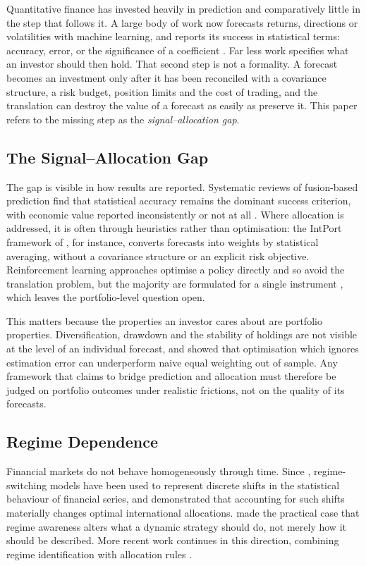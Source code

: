 \documentclass{singlecol-new}
\theoremstyle{TH}{
\newtheorem{lemma}{Lemma}
\newtheorem{theorem}[lemma]{Theorem}
\newtheorem{corrolary}[lemma]{Corrolary}
\newtheorem{conjecture}[lemma]{Conjecture}
\newtheorem{proposition}[lemma]{Proposition}
\newtheorem{claim}[lemma]{Claim}
\newtheorem{stheorem}[lemma]{Wrong Theorem}
\newtheorem{algorithm}{Algorithm}
}
\theoremstyle{THrm}{
\newtheorem{definition}{Definition}[section]
\newtheorem{question}{Question}[section]
\newtheorem{remark}{Remark}
\newtheorem{scheme}{Scheme}
}
\theoremstyle{THhit}{
\newtheorem{case}{Case}[section]
}
\begin{document}
Quantitative finance has invested heavily in prediction and comparatively little in the
step that follows it. A large body of work now forecasts returns, directions or
volatilities with machine learning, and reports its success in statistical terms:
accuracy, error, or the significance of a coefficient \citep{gu20, zhang22}. Far less
work specifies what an investor should then hold. That second step is not a
formality. A forecast becomes an investment only after it has been reconciled with a
covariance structure, a risk budget, position limits and the cost of trading, and the
translation can destroy the value of a forecast as easily as preserve it. This paper
refers to the missing step as the \emph{signal--allocation gap}.

\subsection{The Signal--Allocation Gap}

The gap is visible in how results are reported. Systematic reviews of fusion-based
prediction find that statistical accuracy remains the dominant success criterion, with
economic value reported inconsistently or not at all \citep{zhang22}. Where allocation
is addressed, it is often through heuristics rather than optimisation: the IntPort
framework of \citet{sami25}, for instance, converts forecasts into weights by
statistical averaging, without a covariance structure or an explicit risk objective.
Reinforcement learning approaches optimise a policy directly and so avoid the
translation problem, but the majority are formulated for a single instrument
\citep{saijai26, jiang25}, which leaves the portfolio-level question open.

This matters because the properties an investor cares about are portfolio properties.
Diversification, drawdown and the stability of holdings are not visible at the level of
an individual forecast, and \citet{demiguel09} showed that optimisation which ignores
estimation error can underperform naive equal weighting out of sample. Any framework
that claims to bridge prediction and allocation must therefore be judged on portfolio
outcomes under realistic frictions, not on the quality of its forecasts.

\subsection{Regime Dependence}

Financial markets do not behave homogeneously through time. Since \citet{hamilton89},
regime-switching models have been used to represent discrete shifts in the statistical
behaviour of financial series, and \citet{angbekaert02} demonstrated that accounting for
such shifts materially changes optimal international allocations. \citet{kritzman12}
made the practical case that regime awareness alters what a dynamic strategy should do,
not merely how it should be described. More recent work continues in this direction,
combining regime identification with allocation rules \citep{li25, luo26}.
\end{document}
